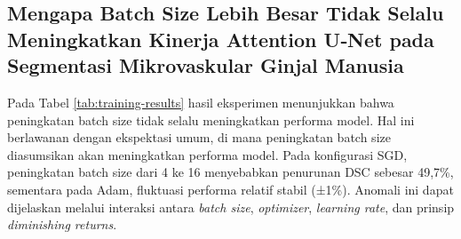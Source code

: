 \subsection{Mengapa Batch Size Lebih Besar Tidak Selalu Meningkatkan Kinerja Attention U‑Net pada Segmentasi Mikrovaskular Ginjal Manusia}

Pada Tabel \ref{tab:training-results} hasil eksperimen menunjukkan bahwa peningkatan batch size tidak selalu meningkatkan performa model. Hal ini berlawanan dengan ekspektasi umum, di mana peningkatan batch size diasumsikan akan meningkatkan performa model. Pada konfigurasi SGD, peningkatan batch size dari 4 ke 16 menyebabkan penurunan DSC sebesar 49{,}7\%, sementara pada Adam, fluktuasi performa relatif stabil (±1\%). Anomali ini dapat dijelaskan melalui interaksi antara \textit{batch size}, \textit{optimizer}, \textit{learning rate}, dan prinsip \textit{diminishing returns}.

